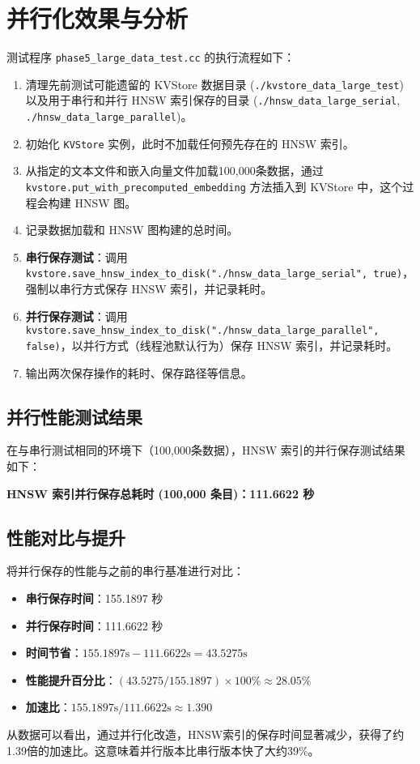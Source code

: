 \documentclass{ctexart} %
\begin{document}
\section{并行化效果与分析}
测试程序 \texttt{phase5_large_data_test.cc} 的执行流程如下：
\begin{enumerate}
    \item 清理先前测试可能遗留的 KVStore 数据目录 (\texttt{./kvstore_data_large_test}) 以及用于串行和并行 HNSW 索引保存的目录 (\texttt{./hnsw_data_large_serial}, \texttt{./hnsw_data_large_parallel})。
    \item 初始化 \texttt{KVStore} 实例，此时不加载任何预先存在的 HNSW 索引。
    \item 从指定的文本文件和嵌入向量文件加载100,000条数据，通过 \texttt{kvstore.put_with_precomputed_embedding} 方法插入到 KVStore 中，这个过程会构建 HNSW 图。
    \item 记录数据加载和 HNSW 图构建的总时间。
    \item \textbf{串行保存测试}：调用 \texttt{kvstore.save_hnsw_index_to_disk("./hnsw_data_large_serial", true)}，强制以串行方式保存 HNSW 索引，并记录耗时。
    \item \textbf{并行保存测试}：调用 \texttt{kvstore.save_hnsw_index_to_disk("./hnsw_data_large_parallel", false)}，以并行方式（线程池默认行为）保存 HNSW 索引，并记录耗时。
    \item 输出两次保存操作的耗时、保存路径等信息。
\end{enumerate}

\subsection{并行性能测试结果}
在与串行测试相同的环境下（100,000条数据），HNSW 索引的并行保存测试结果如下：

\textbf{HNSW 索引并行保存总耗时 (100,000 条目)：111.6622 秒}

\subsection{性能对比与提升}
将并行保存的性能与之前的串行基准进行对比：
\begin{itemize}
    \item \textbf{串行保存时间}：155.1897 秒
    \item \textbf{并行保存时间}：111.6622 秒
    \item \textbf{时间节省}：$155.1897 \text{s} - 111.6622 \text{s} = 43.5275 \text{s}$
    \item \textbf{性能提升百分比}：$(43.5275 / 155.1897) \times 100\% \approx 28.05\%$
    \item \textbf{加速比}：$155.1897 \text{s} / 111.6622 \text{s} \approx 1.390$
\end{itemize}
从数据可以看出，通过并行化改造，HNSW索引的保存时间显著减少，获得了约1.39倍的加速比。这意味着并行版本比串行版本快了大约39\%。
\end{document}

